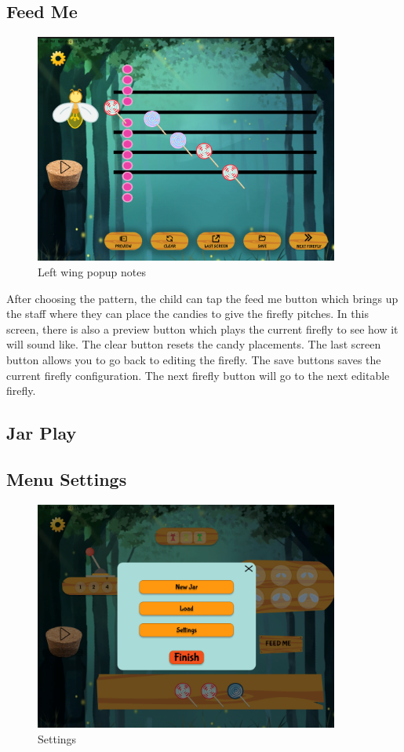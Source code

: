 \subsection{Feed Me}

\begin{figure}[H]
    \centering
    \includegraphics[width=10cm]{figures/newScreenFlows/newfeedme.png}
    \caption{Left wing popup notes}
    \label{fig:newleftwing}
\end{figure}

After choosing the pattern, the child can tap the feed me button which brings up the staff where they can place the candies to give the firefly pitches. In this screen, there is also a preview button which plays the current firefly to see how it will sound like. The clear button resets the candy placements. The last screen button allows you to go back to editing the firefly. The save buttons saves the current firefly configuration. The next firefly button will go to the next editable firefly.

\subsection{Jar Play}



\subsection{Menu Settings}

\begin{figure}[H]
    \centering
    \includegraphics[width=10cm]{figures/newScreenFlows/newmainsettings.png}
    \caption{Settings}
    \label{fig:newsettings}
\end{figure}

